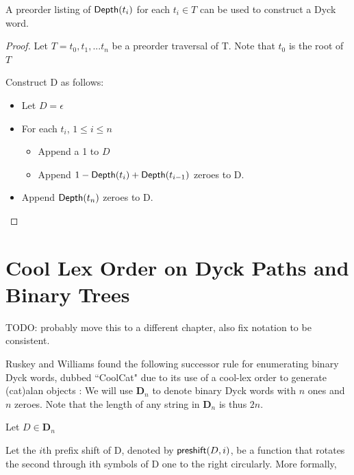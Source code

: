 \begin{remark}A preorder listing of $\mathsf{Depth}{(t_i)} $ for each $ t_i \in T$ can be used to construct a Dyck word. \label{re:construct_dyck}

\end{remark} 
\begin{proof}

    Let $T=t_0,t_1,...t_n$ be a preorder traversal of T.  Note that $t_0$ is the root of $T$

    Construct D as follows: 

    \begin{itemize}
	\item Let $D=\epsilon$ %
	\item For each $t_i$, $1\le i \le n$
	    \begin{itemize}
		\item Append a 1 to $D$
		\item Append $1-\mathsf{Depth}{(t_{i})}+\mathsf{Depth}{(t_{i-1})}$ zeroes to D.
	    \end{itemize}
	\item Append $\mathsf{Depth}{(t_{n})}$ zeroes to D. 
    \end{itemize}
\end{proof} 

\section{Cool Lex Order on Dyck Paths and Binary Trees}
TODO: probably move this to a different chapter, also fix notation to be consistent. 

Ruskey and Williams found the following successor rule for enumerating binary Dyck words, dubbed ``CoolCat" due to its use of a cool-lex order to generate (cat)alan objects \cite{ruskey2008generating}:
We will use $\mathbf{D}_n$ to denote binary Dyck words with $n$ ones and $n$ zeroes.  Note that the length of any string in $\mathbf{D}_n$ is thus $2n$.

\noindent Let $D \in \mathbf{D}_n$

\noindent Let the $i$th prefix shift of D, denoted by $\mathsf{preshift(} D, i \mathsf{)}$, be a function that rotates the second through ith symbols of D one to the right circularly.  More formally, 

